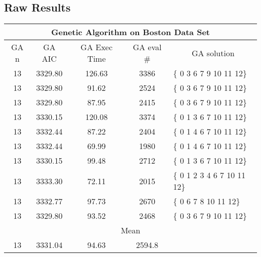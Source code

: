 \subsection{Raw Results}
\label{rawResultsBoston}
\begin{tabular}{|c|c|c|c|l|}
	\hline
	\multicolumn{5}{|c|}{Genetic Algorithm on Boston Data Set}                                        \\ \hline
	GA n & GA AIC      & GA Exec Time & GA eval \# & \multicolumn{1}{c|}{GA solution} \\ \hline
	13   & 3329.80  & 126.63           & 3386                  & \{ 0 3 6 7 9 10 11 12\}          \\ \hline
	13   & 3329.80 & 91.62            & 2524                  & \{ 0 3 6 7 9 10 11 12\}          \\ \hline
	13   & 3329.80  & 87.95            & 2415                  & \{ 0 3 6 7 9 10 11 12\}          \\ \hline
	13   & 3330.15 & 120.08           & 3374                  & \{ 0 1 3 6 7 10 11 12\}          \\ \hline
	13   & 3332.44 & 87.22            & 2404                  & \{ 0 1 4 6 7 10 11 12\}          \\ \hline
	13   & 3332.44 & 69.99            & 1980                  & \{ 0 1 4 6 7 10 11 12\}          \\ \hline
	13   & 3330.15 & 99.48            & 2712                  & \{ 0 1 3 6 7 10 11 12\}          \\ \hline
	13   & 3333.30 & 72.11            & 2015                  & \{ 0 1 2 3 4 6 7 10 11 12\}      \\ \hline
	13   & 3332.77 & 97.73            & 2670                  & \{ 0 6 7 8 10 11 12\}            \\ \hline
	13   & 3329.80  & 93.52             & 2468                  & \{ 0 3 6 7 9 10 11 12\}          \\ \hline
	\multicolumn{5}{|c|}{Mean}                                                                        \\ \hline
	13   & 3331.04 & 94.63           & 2594.8                &                                  \\ \hline
\end{tabular}

